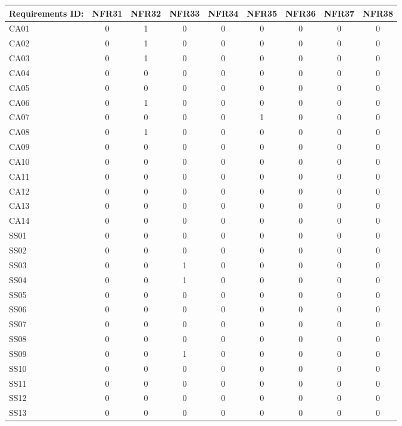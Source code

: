 \documentclass [10pt]{article}
\begin{document}
\begin{longtable}{ | p{} | c | c | c | c | c | c | c | c | }
\hline
	Requirements ID: & NFR31 & NFR32 & NFR33 & NFR34 & NFR35 & NFR36 & NFR37 & NFR38 \\ \hline
	CA01 & 0 & 1 & 0 & 0 & 0 & 0 & 0 & 0 \\ \hline
	CA02 & 0 & 1 & 0 & 0 & 0 & 0 & 0 & 0 \\ \hline
	CA03 & 0 & 1 & 0 & 0 & 0 & 0 & 0 & 0 \\ \hline
	CA04 & 0 & 0 & 0 & 0 & 0 & 0 & 0 & 0 \\ \hline
	CA05 & 0 & 0 & 0 & 0 & 0 & 0 & 0 & 0 \\ \hline
	CA06 & 0 & 1 & 0 & 0 & 0 & 0 & 0 & 0 \\ \hline
	CA07 & 0 & 0 & 0 & 0 & 1 & 0 & 0 & 0 \\ \hline
	CA08 & 0 & 1 & 0 & 0 & 0 & 0 & 0 & 0 \\ \hline
	CA09 & 0 & 0 & 0 & 0 & 0 & 0 & 0 & 0 \\ \hline
	CA10 & 0 & 0 & 0 & 0 & 0 & 0 & 0 & 0 \\ \hline
	CA11 & 0 & 0 & 0 & 0 & 0 & 0 & 0 & 0 \\ \hline
	CA12 & 0 & 0 & 0 & 0 & 0 & 0 & 0 & 0 \\ \hline
	CA13 & 0 & 0 & 0 & 0 & 0 & 0 & 0 & 0 \\ \hline
	CA14 & 0 & 0 & 0 & 0 & 0 & 0 & 0 & 0 \\ \hline
	SS01 & 0 & 0 & 0 & 0 & 0 & 0 & 0 & 0 \\ \hline
	SS02 & 0 & 0 & 0 & 0 & 0 & 0 & 0 & 0 \\ \hline
	SS03 & 0 & 0 & 1 & 0 & 0 & 0 & 0 & 0 \\ \hline
	SS04 & 0 & 0 & 1 & 0 & 0 & 0 & 0 & 0 \\ \hline
	SS05 & 0 & 0 & 0 & 0 & 0 & 0 & 0 & 0 \\ \hline
	SS06 & 0 & 0 & 0 & 0 & 0 & 0 & 0 & 0 \\ \hline
	SS07 & 0 & 0 & 0 & 0 & 0 & 0 & 0 & 0 \\ \hline
	SS08 & 0 & 0 & 0 & 0 & 0 & 0 & 0 & 0 \\ \hline
	SS09 & 0 & 0 & 1 & 0 & 0 & 0 & 0 & 0 \\ \hline
	SS10 & 0 & 0 & 0 & 0 & 0 & 0 & 0 & 0 \\ \hline
	SS11 & 0 & 0 & 0 & 0 & 0 & 0 & 0 & 0 \\ \hline
	SS12 & 0 & 0 & 0 & 0 & 0 & 0 & 0 & 0 \\ \hline
	SS13 & 0 & 0 & 0 & 0 & 0 & 0 & 0 & 0 \\ \hline

\end{longtable}
\end{document}
